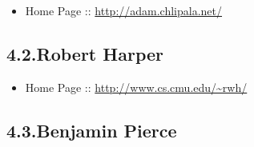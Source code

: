 \documentclass[12pt,twoside]{article}
\begin{document}
\begin{itemize}[noitemsep,topsep=\mdcompacttopsep]%

\item{}Home Page :: \href{http://adam.chlipala.net/}{{\ttfamily http://\hspace{0pt}adam.\hspace{0pt}chlipala.\hspace{0pt}net/\hspace{0pt}}}%
\end{itemize}%

\subsection{4.2.\hspace*{0.5em}Robert Harper}\label{sec-robert-harper}%

\begin{itemize}[noitemsep,topsep=\mdcompacttopsep]%

\item{}Home Page :: \href{http://www.cs.cmu.edu/~rwh/}{{\ttfamily http://\hspace{0pt}www.\hspace{0pt}cs.\hspace{0pt}cmu.\hspace{0pt}edu/\hspace{0pt}\textasciitilde{}rwh/\hspace{0pt}}}%
\end{itemize}%

\subsection{4.3.\hspace*{0.5em}Benjamin Pierce}\label{sec-benjamin-pierce}%
\end{document}
